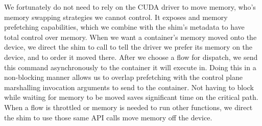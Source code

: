 We fortunately do not need to rely on the CUDA driver to move memory, who's memory swapping strategies we cannot control.
It exposes  and memory prefetching capabilities, which we combine with the shim's metadata to have total control over memory. 
When we want a container's memory moved onto the device, we direct the shim to call  to tell the driver we prefer its memory on the device, and  to order it moved there.
After we choose a flow for dispatch, we send this command asynchronously to the container it will execute in.
Doing this in a non-blocking manner allows us to overlap prefetching with the control plane marshalling invocation arguments to send to the container.
Not having to block while waiting for memory to be moved saves significant time on the critical path.
When a flow is throttled or memory is needed to run other functions, we direct the shim to use those same API calls move memory off the device.


